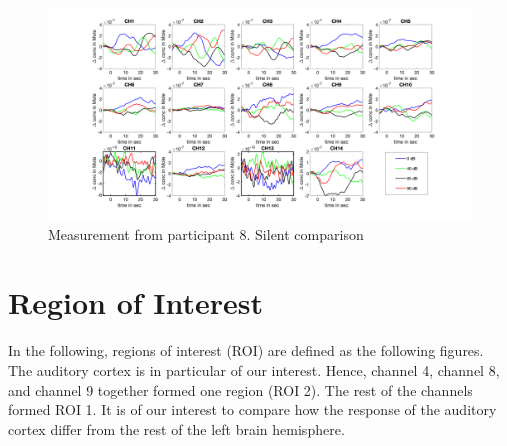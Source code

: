 \begin{figure}[H]
  \centering
    \includegraphics[scale=.4]{bilder/HbR_Mole/sub_luca2_s_HbR.png}
  \caption{Measurement from participant 8. Silent comparison}
  \label{fig:somesignal}
\end{figure}





\section {Region of Interest}
In the following, regions of interest (ROI) are defined as the following figures. The auditory cortex is in particular of our interest. Hence, channel 4, channel 8, and channel 9 together formed one region (ROI 2). The rest of the channels formed ROI 1. It is of our interest to compare how the response of the auditory cortex differ from the rest of the left brain hemisphere.


